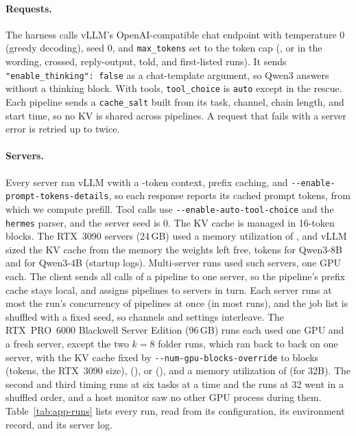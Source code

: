 \documentclass[sigplan,10pt,nonacm,review,anonymous]{acmart}
\begin{document}
\paragraph{Requests.} The harness calls vLLM's OpenAI-compatible chat endpoint with temperature 0 (greedy
decoding), seed 0, and \texttt{max\_tokens} set to the token cap (\nCapMain, or \nCapSplit in the wording,
crossed, reply-output, told, and first-listed runs). It sends \texttt{"enable\_thinking": false} as a chat-template
argument, so Qwen3 answers without a thinking block. With tools, \texttt{tool\_choice} is \texttt{auto} except in
the rescue. Each pipeline sends a \texttt{cache\_salt} built from its task, channel, chain length, and start time,
so no KV is shared across pipelines. A request that fails with a server error is retried up to twice.

\paragraph{Servers.} Every server ran vLLM v\nAppVllm with a \nMaxLen-token context, prefix caching, and
\texttt{-{}-enable-}\allowbreak\texttt{prompt-}\allowbreak\texttt{tokens-}\allowbreak\texttt{details}, so each response reports its cached prompt tokens, from which we
compute prefill. Tool calls use \texttt{-{}-enable-}\allowbreak\texttt{auto-}\allowbreak\texttt{tool-}\allowbreak\texttt{choice} and the \texttt{hermes} parser, and the
server seed is 0. The KV cache is managed in 16-token blocks. The RTX~3090 servers (24\,GB) used a memory
utilization of \nAppUtilRtx, and vLLM sized the KV cache from the memory the weights left free, \nBigKv tokens
for Qwen3-8B and \nSmallKv for Qwen3-4B (startup logs). Multi-server runs used \nAppServersWord such servers,
one GPU each. The client sends all calls of a pipeline to one server, so the pipeline's prefix cache stays
local, and assigns pipelines to servers in turn. Each server runs at most the run's concurrency of pipelines at once (\nConc in most runs), and the
job list is shuffled with a fixed seed, so channels and settings interleave. The RTX~PRO~6000 Blackwell Server
Edition (96\,GB) runs each used one GPU and a fresh server, except the two $k=8$ folder runs, which ran back
to back on one server, with the KV cache fixed by
\texttt{-{}-num-}\allowbreak\texttt{gpu-}\allowbreak\texttt{blocks-}\allowbreak\texttt{override} to \nAppBlocksSmall blocks (\nAppKvExactSmall tokens, the RTX~3090 size),
\nAppBlocksMid (\nAppKvExactMid), or \nAppBlocksHi (\nAppKvExactHi), and a memory utilization of \nAppUtilPro
(\nAppUtilProBig for 32B). The second and third timing runs at six tasks at a time and the runs at 32 went in
a shuffled order, and a host monitor saw no other GPU process during them. Table~\ref{tab:app-runs} lists every run, read from its configuration, its environment record, and its
server log.
\end{document}
